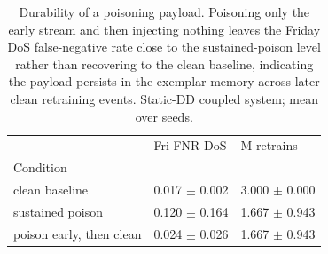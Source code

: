 \begin{table}
\caption{Durability of a poisoning payload. Poisoning only the early stream and then injecting nothing leaves the Friday DoS false-negative rate close to the sustained-poison level rather than recovering to the clean baseline, indicating the payload persists in the exemplar memory across later clean retraining events. Static-DD coupled system; mean over seeds.}
\label{tab:rq3-durability}
\begin{tabular}{lll}
\toprule
 & Fri FNR DoS & M retrains \\
Condition &  &  \\
\midrule
clean baseline & 0.017 $\pm$ 0.002 & 3.000 $\pm$ 0.000 \\
sustained poison & 0.120 $\pm$ 0.164 & 1.667 $\pm$ 0.943 \\
poison early, then clean & 0.024 $\pm$ 0.026 & 1.667 $\pm$ 0.943 \\
\bottomrule
\end{tabular}
\end{table}

